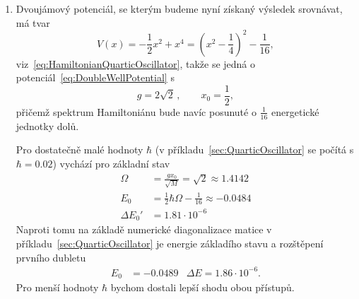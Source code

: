 \begin{solution}
\begin{enumerate}
	\item
		Dvoujámový potenciál, se kterým budeme nyní získaný výsledek srovnávat, má tvar
		\begin{equation}
			V(x)=-\frac{1}{2}x^{2}+x^{4}=\left(x^{2}-\frac{1}{4}\right)^{2}-\frac{1}{16},
		\end{equation}
		viz~\eqref{eq:HamiltonianQuarticOscillator}, takže se jedná o potenciál~\eqref{eq:DoubleWellPotential} s
		\begin{equation}
			g=2\sqrt{2}\,,\qquad x_{0}=\frac{1}{2},
		\end{equation}
		přičemž spektrum Hamiltoniánu bude navíc posunuté o $\frac{1}{16}$ energetické jednotky dolů.
		
		Pro dostatečně malé hodnoty $\hbar$ (v příkladu~\ref{sec:QuarticOscillator} se počítá s $\hbar=0.02$) vychází pro základní stav
		\begin{align}
			\Omega&=\frac{g x_{0}}{\sqrt{M}}=\sqrt{2}\approx1.4142\nonumber\\
			E_{0}&=\frac{1}{2}\hbar\Omega-\frac{1}{16}\approx-0.0484\nonumber\\
			\Delta E_{0}'&=1.81\cdot 10^{-6}
		\end{align}
		Naproti tomu na základě numerické diagonalizace matice v příkladu~\ref{sec:QuarticOscillator} je energie základího stavu a rozštěpení prvního dubletu
		\begin{align}
			E_{0}&=-0.0489 & \Delta E=1.86\cdot 10^{-6}.
		\end{align}
		Pro menší hodnoty $\hbar$ bychom dostali lepší shodu obou přístupů.
	\end{enumerate}
\end{solution}
	

